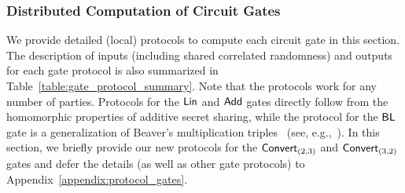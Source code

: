 \subsubsection{Distributed Computation of Circuit Gates}
We provide detailed (local) protocols to compute each circuit gate in this section. The description of inputs (including shared correlated randomness) and outputs for each gate protocol is also summarized in Table~\ref{table:gate_protocol_summary}. Note that the protocols work for any number of parties.
Protocols for the $\textnormal{\textsf{Lin}}$ and $\textnormal{\textsf{Add}}$ gates directly follow from the homomorphic properties of additive secret sharing, while the protocol for the $\textnormal{\textsf{BL}}$ gate is a generalization of Beaver's multiplication triples~\cite{beaver1991-triples} (see, e.g.,~\cite{boyle2019-fss-preprocess}). \iffull\else In this section, we briefly provide our new protocols for the $\textnormal{\textsf{Convert}}_{(2,3)}$ and $\textnormal{\textsf{Convert}}_{(3,2)}$ gates and defer the details (as well as other gate protocols) to Appendix~\ref{appendix:protocol_gates}.\fi

\begin{table}[t!]
\caption{Summary of input, output, and randomness for circuit gate protocols.
}
\label{table:gate_protocol_summary}
\end{table}


